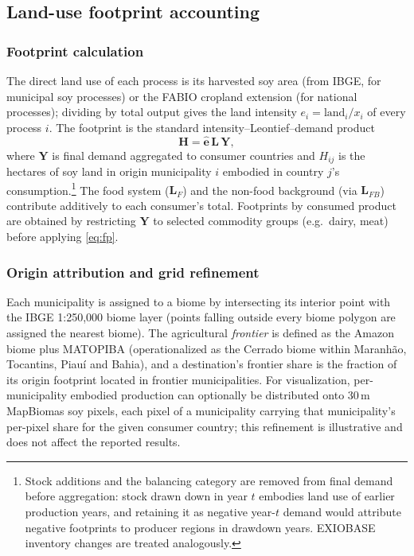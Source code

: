 \documentclass[pdflatex,sn-nature]{sn-jnl}%
\begin{document}
\subsection{Land-use footprint accounting}\label{subsec:footprint}

\subsubsection{Footprint calculation}\label{subsubsec:stressor}
The direct land use of each process is its harvested soy area (from IBGE, for
municipal soy processes) or the FABIO cropland extension (for
national processes); dividing by total output gives the land intensity
$e_i=\text{land}_i/x_i$ of every process $i$. The footprint is the standard
intensity--Leontief--demand product
\begin{equation}\label{eq:fp}
  \mathbf{H}=\hat{\mathbf{e}}\,\mathbf{L}\,\mathbf{Y},
\end{equation}
where $\mathbf{Y}$ is final demand aggregated to consumer countries and
$H_{ij}$ is the hectares of soy land in origin municipality $i$ embodied in
country $j$'s consumption.\footnote{Stock additions and the balancing category
are removed from final demand before aggregation: stock drawn down in year $t$
embodies land use of earlier production years, and retaining it as negative
year-$t$ demand would attribute negative footprints to producer regions in
drawdown years. EXIOBASE inventory changes are treated analogously.} The food
system ($\mathbf{L}_F$) and the non-food background (via $\mathbf{L}_{FB}$)
contribute additively to each consumer's total. Footprints by consumed
product are obtained by restricting $\mathbf{Y}$ to selected commodity groups
(e.g.\ dairy, meat) before applying \eqref{eq:fp}.


\subsubsection{Origin attribution and grid refinement}\label{subsubsec:attribution}
Each municipality is assigned to a biome by intersecting its interior point
with the IBGE 1:250{,}000 biome layer (points falling outside every biome
polygon are assigned the nearest biome). The agricultural \emph{frontier} is
defined as the Amazon biome plus MATOPIBA (operationalized as the Cerrado
biome within Maranh\~ao, Tocantins, Piau\'i and Bahia), and a destination's
frontier share is the fraction of its origin footprint located in frontier
municipalities. For visualization, per-municipality embodied production can
optionally be distributed onto 30\,m MapBiomas soy pixels, each pixel of a
municipality carrying that municipality's per-pixel share for the given
consumer country; this refinement is illustrative and does not affect the
reported results.
\end{document}
